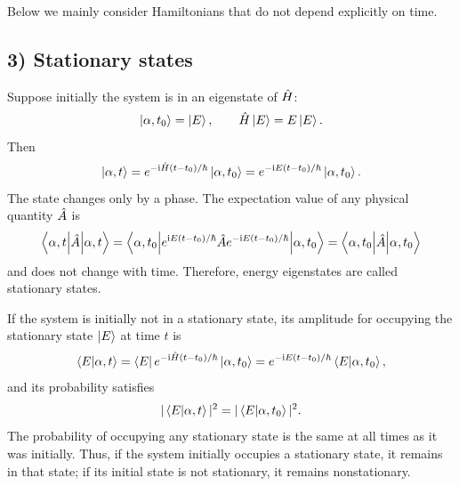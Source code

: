 Below we mainly consider Hamiltonians that do not depend explicitly on time.

\subsection*{3) Stationary states}
Suppose initially the system is in an eigenstate of $\hat{H}$:
\begin{equation}
\left|\alpha,t_0\right\rangle=\left|E\right\rangle,\qquad\hat{H}\left|E\right\rangle=E\left|E\right\rangle.
\end{equation}
Then
\begin{equation}
\left|\alpha,t\right\rangle=e^{-\mathrm{i}\hat{H}(t-t_0)/\hbar}\left|\alpha,t_0\right\rangle
=e^{-\mathrm{i} E(t-t_0)/\hbar}\left|\alpha,t_0\right\rangle.
\end{equation}
The state changes only by a phase. The expectation value of any physical quantity $\hat{A}$ is
\begin{equation}
\left\langle\alpha,t\middle|\hat{A}\middle|\alpha,t\right\rangle
=\left\langle\alpha,t_0\middle|e^{\mathrm{i} E(t-t_0)/\hbar}\hat{A} e^{-\mathrm{i} E(t-t_0)/\hbar}\middle|\alpha,t_0\right\rangle
=\left\langle\alpha,t_0\middle|\hat{A}\middle|\alpha,t_0\right\rangle
\end{equation}
and does not change with time. Therefore, energy eigenstates are called stationary states.

If the system is initially not in a stationary state, its amplitude for occupying the stationary state $\left|E\right\rangle$ at time $t$ is
\begin{equation}
\left\langle E\middle|\alpha,t\right\rangle=\left\langle E\right| e^{-\mathrm{i}\hat{H}(t-t_0)/\hbar}\left|\alpha,t_0\right\rangle
=e^{-\mathrm{i} E(t-t_0)/\hbar}\left\langle E\middle|\alpha,t_0\right\rangle,
\end{equation}
and its probability satisfies
\begin{equation}
|\left\langle E\middle|\alpha,t\right\rangle|^2=|\left\langle E\middle|\alpha,t_0\right\rangle|^2.
\end{equation}
The probability of occupying any stationary state is the same at all times as it was initially. Thus, if the system initially occupies a stationary state, it remains in that state; if its initial state is not stationary, it remains nonstationary.

